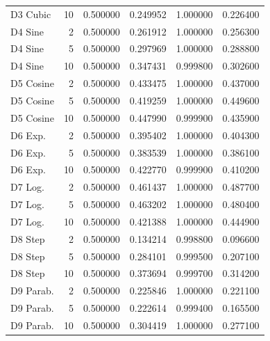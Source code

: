 \begin{tabular}{lrrrrr}
    D3 Cubic &   10 & 0.500000 &    0.249952 &  1.000000 &          0.226400 \\
     D4 Sine &    2 & 0.500000 &    0.261912 &  1.000000 &          0.256300 \\
     D4 Sine &    5 & 0.500000 &    0.297969 &  1.000000 &          0.288800 \\
     D4 Sine &   10 & 0.500000 &    0.347431 &  0.999800 &          0.302600 \\
   D5 Cosine &    2 & 0.500000 &    0.433475 &  1.000000 &          0.437000 \\
   D5 Cosine &    5 & 0.500000 &    0.419259 &  1.000000 &          0.449600 \\
   D5 Cosine &   10 & 0.500000 &    0.447990 &  0.999900 &          0.435900 \\
     D6 Exp. &    2 & 0.500000 &    0.395402 &  1.000000 &          0.404300 \\
     D6 Exp. &    5 & 0.500000 &    0.383539 &  1.000000 &          0.386100 \\
     D6 Exp. &   10 & 0.500000 &    0.422770 &  0.999900 &          0.410200 \\
     D7 Log. &    2 & 0.500000 &    0.461437 &  1.000000 &          0.487700 \\
     D7 Log. &    5 & 0.500000 &    0.463202 &  1.000000 &          0.480400 \\
     D7 Log. &   10 & 0.500000 &    0.421388 &  1.000000 &          0.444900 \\
     D8 Step &    2 & 0.500000 &    0.134214 &  0.998800 &          0.096600 \\
     D8 Step &    5 & 0.500000 &    0.284101 &  0.999500 &          0.207100 \\
     D8 Step &   10 & 0.500000 &    0.373694 &  0.999700 &          0.314200 \\
   D9 Parab. &    2 & 0.500000 &    0.225846 &  1.000000 &          0.221100 \\
   D9 Parab. &    5 & 0.500000 &    0.222614 &  0.999400 &          0.165500 \\
   D9 Parab. &   10 & 0.500000 &    0.304419 &  1.000000 &          0.277100 \\
\bottomrule
\end{tabular}
